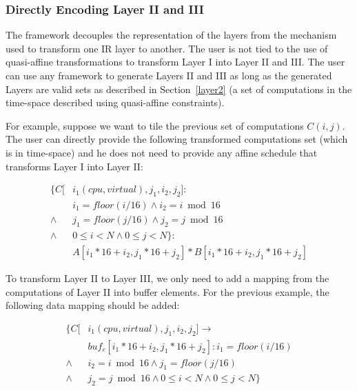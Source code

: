 


\subsubsection{Directly Encoding Layer II and III}

The \framework framework decouples the representation of the layers from the mechanism used to transform one IR layer to another.  The user is not tied to the use of quasi-affine transformations to transform Layer I into Layer II and III.  The user can use any framework to generate Layers II and III as long as the generated Layers are valid sets as described in Section~\ref{layer2} (a set of computations in the time-\processor space described using quasi-affine constraints).

For example, suppose we want to tile the previous set of computations $C(i,j)$.  The user can directly provide the following transformed computations set  (which is in time-\processor space) and he does not need to provide any affine schedule that transforms Layer I into Layer II:

\begin{align*}
\{C[& i_1 (cpu, virtual), j_1, i_2, j_2]:  \\
    & i_1=floor(i/16) \wedge i_2=i\bmod 16 \\
   \wedge &  j_1=floor(j/16) \wedge j_2=j\bmod 16 \\
   \wedge & 0\leq i < N \wedge 0\leq j < N \}:\\
   & A[i_1*16+i_2, j_1*16+j_2] * B[i_1*16+i_2, j_1*16+j_2]
\end{align*}

To transform Layer II to Layer III, we only need to add a mapping from the computations of Layer II into buffer elements.
For the previous example, the following data mapping should be added:

\begin{align*}
\{C[ & i_1 (cpu, virtual), j_1, i_2, j_2] \rightarrow \\
     & buf_c[i_1*16+i_2, j_1*16+j_2]: i_1=floor(i/16) \\
     \wedge & i_2=i\bmod 16 \wedge j_1=floor(j/16) \\
     \wedge & j_2=j\bmod 16 \wedge 0\leq i < N \wedge 0\leq j < N \}
\end{align*}


